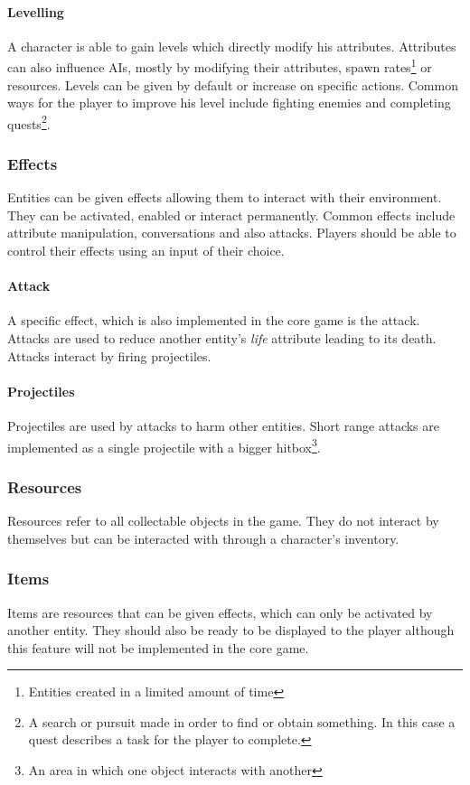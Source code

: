 \documentclass[11pt]{article}
\begin{document}
\paragraph{Levelling}
A character is able to gain levels which directly modify his attributes.
Attributes can also influence AIs, mostly by modifying their attributes, spawn rates\footnote{Entities created in a limited amount of time} or resources.
Levels can be given by default or increase on specific actions. 
Common ways for the player to improve his level include fighting enemies and completing quests\footnote{A search or pursuit made in order to find or obtain something. 
In this case a quest describes a task for the player to complete.}.
\subsubsection{Effects}
Entities can be given effects allowing them to interact with their environment.
They can be activated, enabled or interact permanently. Common effects include attribute manipulation, conversations and also attacks.
Players should be able to control their effects using an input of their choice.
\paragraph{Attack}
A specific effect, which is also implemented in the core game is the attack. Attacks are used to reduce another entity's \textit{life} attribute leading to its death.
Attacks interact by firing projectiles.
\paragraph{Projectiles}
Projectiles are used by attacks to harm other entities. Short range attacks are implemented as a single projectile with a bigger hitbox\footnote{An area in which one object interacts with another}.
\subsubsection{Resources}
Resources refer to all collectable objects in the game. They do not interact by themselves but can be interacted with through a character's inventory.
\subsubsection{Items}
Items are resources that can be given effects, which can only be activated by another entity. 
They should also be ready to be displayed to the player although this feature will not be implemented in the core game.
\end{document}
